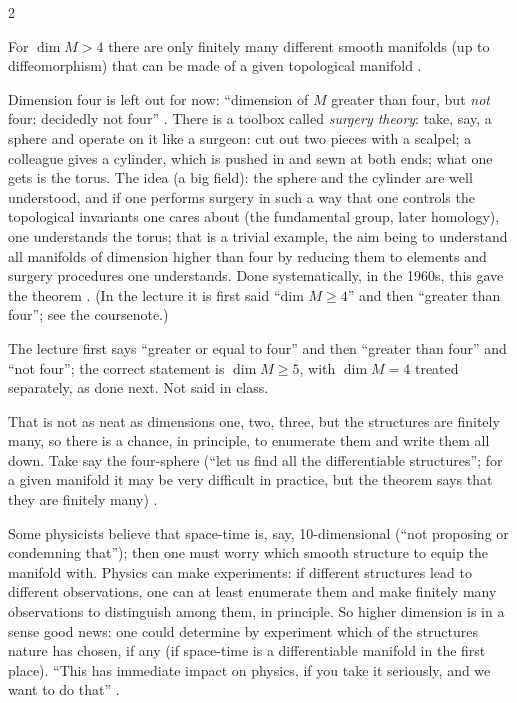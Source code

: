 \begin{paracol}{2}
\begin{theorem}\label{thm:df-high}
For $\dim M>4$ there are only finitely many different smooth manifolds (up to diffeomorphism) that can be made of a given topological manifold .
\end{theorem}
Dimension four is left out for now: ``dimension of $M$ greater than four, but \emph{not} four: decidedly not four'' . There is a toolbox called \emph{surgery theory}: take, say, a sphere and operate on it like a surgeon: cut out two pieces with a scalpel; a colleague gives
a cylinder, which is pushed in and sewn at both ends; what one gets is the torus. The idea (a big field): the sphere and the cylinder are well understood, and if one performs surgery in such a way that one controls the topological invariants one cares about (the fundamental group, later homology), one understands the torus;
that is a trivial example, the aim being to understand all manifolds of dimension higher than four by reducing them to elements and surgery procedures one understands. Done systematically, in the 1960s, this gave the theorem .
(In the lecture it is first said ``dim $M\ge4$'' and then ``greater than four''; see the coursenote.)
\begin{coursenote}
The lecture first says ``greater or equal to four'' and then ``greater than four'' and ``not four''; the correct statement is $\dim M\ge5$, with $\dim M=4$ treated separately, as done next. Not said in class.
\end{coursenote}
That is not as neat as dimensions one, two, three, but the structures are finitely many, so there is a chance, in principle, to enumerate them and write them all down. Take say the four-sphere (``let us find all the differentiable structures''; for a given manifold it may be very difficult in practice, but the theorem
says that they are finitely many) .
\begin{application}\label{app:df-physics}
Some physicists believe that space-time is, say, 10-dimensional (``not proposing or condemning that''); then one must worry which smooth structure to equip the manifold with. Physics can make experiments: if different structures lead to different observations, one can at least enumerate them and make finitely many
observations to distinguish among them, in principle. So higher dimension is in a sense good news: one could determine by experiment which of the structures nature has chosen, if any (if space-time is a differentiable manifold in the first place). ``This has immediate impact on physics, if you take it seriously, and we want to do that''
.
\end{application}


\end{paracol}
